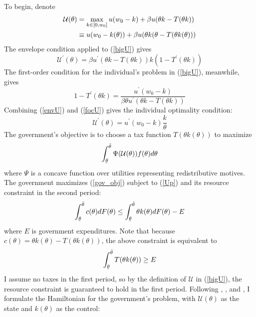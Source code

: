 \documentclass[11pt]{article}
\newcommand{\ubar}[1]{\underaccent{\bar}{#1}}
\newcommand{\p}{\prime}
\newcommand{\U}{\mathcal{U}}
\begin{document}
To begin, denote 
\begin{align}
    \U(\theta) &= \max_{k\in[0, w_0]} u(w_0 - k) + \beta u(\theta k- T(\theta k) ) \notag \\
    &\equiv u(w_0 - k(\theta)) + \beta u(\theta k(\theta- T(\theta k(\theta)) ) \label{bigU}
\end{align}
% 
The envelope condition applied to (\ref{bigU}) gives 
\begin{equation}
    \U^\p(\theta) = \beta u^\p (\theta k - T(\theta k))k (1 - T^\p(\theta k)) \label{envU}
\end{equation}
% 
The first-order condition for the individual's problem in (\ref{bigU}), meanwhile, gives 
\begin{equation}
    1 - T^\p(\theta k) = \frac{u^\p(w_0 - k)}{\beta\theta u^\p (\theta k - T(\theta k))} \label{focU}
\end{equation}
% 
Combining (\ref{envU}) and (\ref{focU}) gives the individual optimality condition: 
\begin{equation}
    \U^\p(\theta) = u^\p(w_0 - k)\frac{k}{\theta} \label{Up}
\end{equation}
%
The government's objective is to choose a tax function \( T(\theta k(\theta)) \) to maximize
\begin{equation}
    \int_{\ubar{\theta}}^{\bar{\theta}} \Psi(\U(\theta))f(\theta)d\theta \label{gov_obj}
\end{equation}
where \( \Psi \) is a concave function over utilities representing redistributive motives. The government maximizes (\ref{gov_obj}) subject to (\ref{Up}) and its resource constraint in the second period:
\begin{equation*}
    \int_{\ubar{\theta}}^{\bar{\theta}} c(\theta) dF(\theta) \leq \int_{\ubar{\theta}}^{\bar{\theta}} \theta k(\theta) dF(\theta) - E 
\end{equation*}
where \( E \) is government expenditures. Note that because \( c(\theta) = \theta k(\theta) - T(\theta k(\theta)) \), the above constraint is equivalent to 
\begin{equation}
    \int_{\ubar{\theta}}^{\bar{\theta}} T(\theta k(\theta)) \geq E \label{rc}
\end{equation}
 I assume no taxes in the first period, so by the definition of \( \U \) in (\ref{bigU}), the resource constraint is guaranteed to hold in the first period. Following \cite{mirrlees1971exploration}, \cite{diamond1998optimal}, and \cite{salanie2011economics}, I formulate the Hamiltonian for the government's problem, with \( \U(\theta) \) as the state and \( k(\theta) \) as the control:
\end{document}

